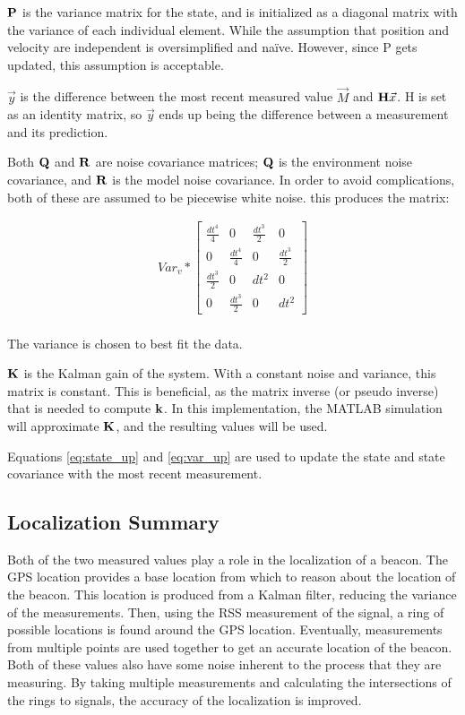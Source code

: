 $\mathbf{P}$ is the variance matrix for the state, and is initialized as a diagonal matrix with the variance of each individual element. While the assumption that position and velocity are independent is oversimplified and na{\"i}ve. However, since P gets updated, this assumption is acceptable. \par
$\vec{y}$ is the difference between the most recent measured value $\vec{M}$ and $\mathbf{H}\vec{x}$. H is set as an identity matrix, so $\vec{y}$ ends up being the difference between a measurement and its prediction. \par
Both $\mathbf{Q}$ and $\mathbf{R}$ are noise covariance matrices; $\mathbf{Q}$ is the environment noise covariance, and $\mathbf{R}$ is the model noise covariance. In order to avoid complications, both of these are assumed to be piecewise white noise. this produces the matrix: 

\begin{align}
Var_v * \begin{bmatrix}\frac{dt^4}{4} & 0 & \frac{dt^3}{2} & 0\\0 & \frac{dt^4}{4} & 0 & \frac{dt^3}{2}\\\frac{dt^3}{2} & 0 & dt^2 & 0 \\ 0 & \frac{dt^3}{2} & 0 & dt^2  \end{bmatrix}
\end{align} \\
The variance is chosen to best fit the data. \par
$\mathbf{K}$ is the Kalman gain of the system. With a constant noise and variance, this matrix is constant. This is beneficial, as the matrix inverse (or pseudo inverse) that is needed to compute $\mathbf{k}$. In this implementation, the MATLAB simulation will approximate $\mathbf{K}$, and the resulting values will be used. \par
Equations \ref{eq:state_up} and \ref{eq:var_up} are used to update the state and state covariance with the most recent measurement.

\subsection{Localization Summary}
Both of the two measured values play a role in the localization of a beacon. The GPS location provides a base location from which to reason about the location of the beacon. This location is produced from a Kalman filter, reducing the variance of the measurements. Then, using the RSS measurement of the signal, a ring of possible locations is found around the GPS location. Eventually, measurements from multiple points are used together to get an accurate location of the beacon. Both of these values also have some noise inherent to the process that they are measuring. By taking multiple measurements and calculating the intersections of the rings to signals, the accuracy of the localization is improved.

